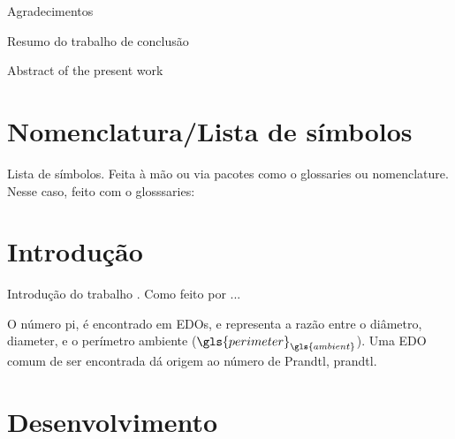 \documentclass[12pt,a4paper,oneside,english,brazil]{abntex2}
\begin{document}
	\imprimircapa%
	\imprimirfolhaderosto
	\imprimirfichacatalografica
	\imprimirfolhadeaprovacao
	\imprimirdedicatoria
	\begin{agradecimentos}
		Agradecimentos
	\end{agradecimentos}
	\imprimirepigrafe
	\begin{resumo}
		Resumo do trabalho de conclusão
	\end{resumo}
	\begin{resumo}[Abstract]
		Abstract of the present work
	\end{resumo}

	\chapter*{Nomenclatura/Lista de símbolos}
	Lista de símbolos. Feita à mão ou via pacotes como o glossaries ou nomenclature. Nesse caso, feito com o glosssaries:
	
	\printglossaries
	
	\cleardoublepage

	
	\tableofcontents*
	\cleardoublepage
	
	\textual
	
	\chapter{Introdução}
	Introdução do trabalho \cite{fox2010}. Como feito por \textcite{article}...
	
	O número \gls{pi}, é encontrado em \glspl{EDO}, e representa a razão entre o diâmetro, \gls{diameter}, e o perímetro ambiente ($\gls{perimeter}_{\gls{ambient}}$). Uma \gls{EDO} comum de ser encontrada dá origem ao número de Prandtl, \gls{prandtl}.
	
	\lipsum[1-8]
	\nocite{*}
	
	\chapter{Desenvolvimento}
	\lipsum[10]
\end{document}
